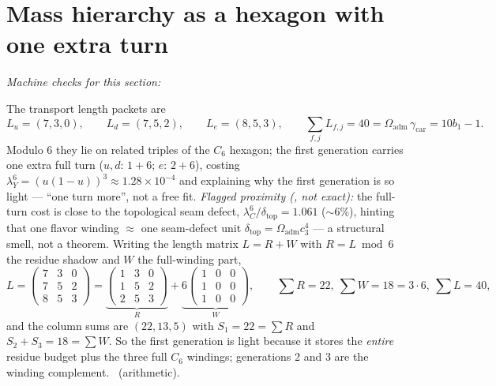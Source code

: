 \documentclass[11pt,a4paper]{article}
\newcommand{\Oadm}{\Omega_{\mathrm{adm}}}
\newcommand{\cthree}{c_3}
\newcommand{\useed}{u}
\newcommand{\dtop}{\delta_{\mathrm{top}}}
\theoremstyle{definition}
\begin{document}
\section{Mass hierarchy as a hexagon with one extra turn}
\noindent\emph{Machine checks for this section:}  


The transport length packets are
\begin{equation}
  L_u=(7,3,0),\qquad L_d=(7,5,2),\qquad L_e=(8,5,3),\qquad \sum_{f,j}L_{f,j}=40=\Oadm\,\gamma_{\mathrm{car}}=10b_1-1 .
\end{equation}
Modulo $6$ they lie on related triples of the $C_6$ hexagon; the first generation carries one extra
full turn ($u,d:\,1+6$; $e:\,2+6$), costing $\lambda_Y^6=(\useed(1-\useed))^3\approx1.28\times10^{-4}$
and explaining why the first generation is so light --- ``one turn more'', not a free fit. \mC
\emph{Flagged proximity (\mO, not exact):} the full-turn cost is close to the topological seam defect,
$\lambda_C^6/\dtop=1.061$ ($\sim6\%$), hinting that one flavor winding $\approx$ one seam-defect unit
$\dtop=\Oadm\cthree^4$ --- a structural smell, not a theorem.
Writing the length matrix $L=R+W$ with $R=L\bmod6$ the residue shadow and $W$ the full-winding part,
\[
  L=\begin{pmatrix}7&3&0\\7&5&2\\8&5&3\end{pmatrix}=
  \underbrace{\begin{pmatrix}1&3&0\\1&5&2\\2&5&3\end{pmatrix}}_{R}+
  \underbrace{6\begin{pmatrix}1&0&0\\1&0&0\\1&0&0\end{pmatrix}}_{W},\qquad
  \sum R=22,\ \sum W=18=3\cdot6,\ \sum L=40,
\]
and the column sums are $(22,13,5)$ with $S_1=22=\sum R$ and $S_2+S_3=18=\sum W$. So the first
generation is light because it stores the \emph{entire} residue budget plus the three full $C_6$
windings; generations 2 and 3 are the winding complement. \mE\ (arithmetic).
\end{document}
